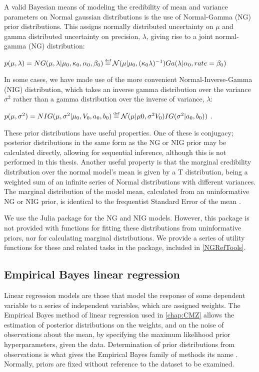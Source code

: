 A valid Bayesian means of modeling the credibility of mean and variance parameters on Normal gaussian distributions is the use of Normal-Gamma (NG) prior distributions. This assigns normally distributed uncertainty on $\mu$ and gamma distributed uncertainty on precision, $\lambda$, giving rise to a joint normal-gamma (NG) distribution:

$p(\mu,\lambda) = NG(\mu,\lambda|\mu_{0},\kappa_{0},\alpha_{0},\beta_{0}) \mathrel{\stackrel{\makebox[0pt]{\mbox{\normalfont\tiny def}}}{=}} \mathcal{N}(\mu|\mu_{0},(\kappa_{0}\lambda)^{-1})Ga(\lambda|\alpha_{0},rate=\beta_0)$ \cite{Murphy2007}

In some cases, we have made use of the more convenient Normal-Inverse-Gamma (NIG) distribution, which takes an inverse gamma distribution over the variance $\sigma^{2}$ rather than a gamma distribution over the inverse of variance, $\lambda$:

$p(\mu,\sigma^2) = NIG(\mu,\sigma^{2}|\mu_{0},V_{0},a_{0},b_{0}) \mathrel{\stackrel{\makebox[0pt]{\mbox{\normalfont\tiny def}}}{=}} \mathcal{N}(\mu|\mu{0},\sigma^{2}V_{0})IG(\sigma^{2}|a_{0},b_{0}))$ \cite{Murphy2007}.

These prior distributions have useful properties. One of these is conjugacy; posterior distributions in the same form as the NG or NIG prior may be calculated directly, allowing for sequential inference, although this is not performed in this thesis. Another useful property is that the marginal credibility distribution over the normal model's mean is given by a T distribution, being a weighted sum of an infinite series of Normal distributions with different variances. The marginal distribution of the model mean, calculated from an uninformative NG or NIG prior, is identical to the frequentist Standard Error of the mean \cite{Murphy2007}.

We use the Julia package  for the NG and NIG models. However, this package is not provided with functions for fitting these distributions from uninformative priors, nor for calculating marginal distributions. We provide a series of utility functions for these and related tasks in the  package, included in \autoref{NGRefTools}.

\subsection{Empirical Bayes linear regression}
\label{ssec:EmpiricalBayes}
Linear regression models are those that model the response of some dependent variable to a series of independent variables, which are assigned weights. The Empirical Bayes method of linear regression used in \autoref{chap:CMZ} allows the estimation of posterior distributions on the weights, and on the noise of observations about the mean, by specifying the maximum likelihood prior hyperparameters, given the data. Determination of prior distributions from observations is what gives the Empirical Bayes family of methods its name \cite[p.373]{Bernardo2000}. Normally, priors are fixed without reference to the dataset to be examined.

